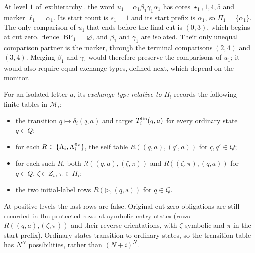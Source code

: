 \begin{example}\label{ex:isolated}
At level $1$ of \cref{ex:hierarchy}, the word $u_1=\alpha_1\beta_1\gamma_1\alpha_1$
has cores $\star_1,1,4,5$ and marker $\ell_1=\alpha_1$. Its start count is
$s_1=1$ and its start prefix is $\alpha_1$, so $\Pi_1=\{\alpha_1\}$. The only
comparison of $u_1$ that ends before the final cut is $(0,3)$, which begins at
cut zero. Hence $\operatorname{BP}_1=\varnothing$, and $\beta_1$ and $\gamma_1$
are isolated. Their only unequal comparison partner is the marker, through the
terminal comparisons $(2,4)$ and $(3,4)$. Merging $\beta_1$ and $\gamma_1$ would
therefore preserve the comparisons of $u_1$; it would also require equal exchange
types, defined next, which depend on the monitor.
\end{example}

For an isolated letter $a$, its \emph{exchange type relative to $\Pi_i$}
records the following finite tables in $\mathcal M_i$:
\begin{itemize}[leftmargin=*]
\item the transition $q\mapsto\delta_i(q,a)$ and target
  $T^{\mathrm{fin}}_i(q,a)$ for every ordinary state $q\in Q$;
\item for each $R\in\{\Lambda_i,\Lambda^{\mathrm{fin}}_i\}$, the self table
  $R((q,a),(q',a))$ for $q,q'\in Q$;
\item for each such $R$, both $R((q,a),(\zeta,\pi))$ and
  $R((\zeta,\pi),(q,a))$ for $q\in Q$, $\zeta\in Z_i$, $\pi\in\Pi_i$;
\item the two initial-label rows $R(\triangleright,(q,a))$ for $q\in Q$.
\end{itemize}
At positive levels the last rows are false. Original cut-zero obligations
are still recorded in the protected rows at symbolic entry states
(rows $R((q,a),(\zeta,\pi))$ and their reverse orientations, with $\zeta$ symbolic
and $\pi$ in the start prefix).
Ordinary states transition to ordinary states, so the transition table has
$N^N$ possibilities, rather than $(N+i)^N$.

